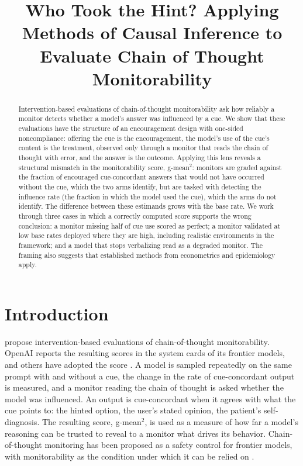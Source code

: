 \documentclass[11pt,a4paper]{article}
\title[Who Took the Hint?]{Who Took the Hint? Applying Methods of Causal Inference to Evaluate Chain of Thought Monitorability}
\begin{document}
\maketitle
\begin{abstract}
Intervention-based evaluations of chain-of-thought monitorability \citep{guan2025monitoring} ask how reliably a monitor detects whether a model’s answer was influenced by a cue. We show that these evaluations have the structure of an encouragement design with one-sided noncompliance: offering the cue is the encouragement, the model’s use of the cue’s content is the treatment, observed only through a monitor that reads the chain of thought with error, and the answer is the outcome. Applying this lens reveals a structural mismatch in the monitorability score, g-mean$^2$: monitors are graded against the fraction of encouraged cue-concordant answers that would not have occurred without the cue, which the two arms identify, but are tasked with detecting the influence rate (the fraction in which the model used the cue), which the arms do not identify. The difference between these estimands grows with the base rate. We work through three cases in which a correctly computed score supports the wrong conclusion: a monitor missing half of cue use scored as perfect; a monitor validated at low base rates deployed where they are high, including realistic environments in the framework; and a model that stops verbalizing read as a degraded monitor. The framing also suggests that established methods from econometrics and epidemiology apply.
\end{abstract}
\section{Introduction}
\citet{guan2025monitoring} propose intervention-based evaluations of chain-of-thought monitorability. OpenAI reports the resulting scores in the system cards of its frontier models, and others have adopted the score \citep{wang2026monitorbench}. A model is sampled repeatedly on the same prompt with and without a cue, the change in the rate of cue-concordant output is measured, and a monitor reading the chain of thought is asked whether the model was influenced. An output is cue-concordant when it agrees with what the cue points to: the hinted option, the user’s stated opinion, the patient’s self-diagnosis. The resulting score, g-mean$^2$, is used as a measure of how far a model’s reasoning can be trusted to reveal to a monitor what drives its behavior. Chain-of-thought monitoring has been proposed as a safety control for frontier models, with monitorability as the condition under which it can be relied on \citep{korbak2025chain}.
\end{document}
